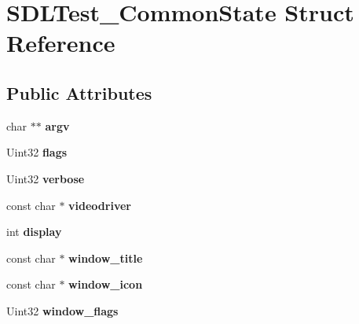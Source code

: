 \hypertarget{struct_s_d_l_test___common_state}{}\section{S\+D\+L\+Test\+\_\+\+Common\+State Struct Reference}
\label{struct_s_d_l_test___common_state}
\subsection*{Public Attributes}
\begin{DoxyCompactItemize}
\item 
\mbox{\label{struct_s_d_l_test___common_state_a6db840410b86ab7c6807763fd8bcb081}} 
char $\ast$$\ast$ {\bfseries argv}
\item 
\mbox{\label{struct_s_d_l_test___common_state_a97272d03558f1f74e579ec8a5cdabc5e}} 
Uint32 {\bfseries flags}
\item 
\mbox{\label{struct_s_d_l_test___common_state_aad4b8ebf6277cd9d3608d2e1b48e4678}} 
Uint32 {\bfseries verbose}
\item 
\mbox{\label{struct_s_d_l_test___common_state_ab3face917946465c60dc0f38f179534d}} 
const char $\ast$ {\bfseries videodriver}
\item 
\mbox{\label{struct_s_d_l_test___common_state_addb3de8e2b278deed8d2309bafd30758}} 
int {\bfseries display}
\item 
\mbox{\label{struct_s_d_l_test___common_state_a86640ebac0afe0c504c3c324d84dcc37}} 
const char $\ast$ {\bfseries window\+\_\+title}
\item 
\mbox{\label{struct_s_d_l_test___common_state_ac9e981b2b60a59f995153c74242d9d43}} 
const char $\ast$ {\bfseries window\+\_\+icon}
\item 
\mbox{\label{struct_s_d_l_test___common_state_a9e38339b34b483087ff8d52d44a80809}} 
Uint32 {\bfseries window\+\_\+flags}
$$
\end{DoxyCompactItemize}
